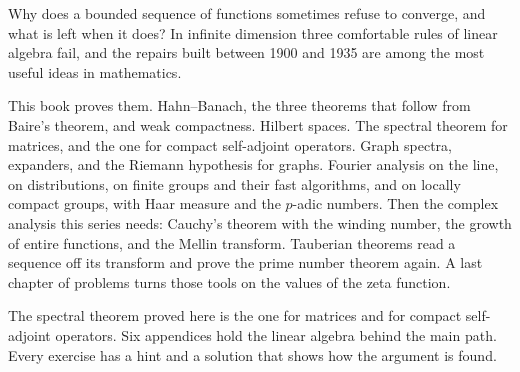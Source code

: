 Why does a bounded sequence of functions sometimes refuse to converge, and what is left when it does? In infinite dimension three comfortable rules of linear algebra fail, and the repairs built between 1900 and 1935 are among the most useful ideas in mathematics.

This book proves them. Hahn--Banach, the three theorems that follow from Baire's theorem, and weak compactness. Hilbert spaces. The spectral theorem for matrices, and the one for compact self-adjoint operators. Graph spectra, expanders, and the Riemann hypothesis for graphs. Fourier analysis on the line, on distributions, on finite groups and their fast algorithms, and on locally compact groups, with Haar measure and the $p$-adic numbers. Then the complex analysis this series needs: Cauchy's theorem with the winding number, the growth of entire functions, and the Mellin transform. Tauberian theorems read a sequence off its transform and prove the prime number theorem again. A last chapter of problems turns those tools on the values of the zeta function.

The spectral theorem proved here is the one for matrices and for compact self-adjoint operators. Six appendices hold the linear algebra behind the main path. Every exercise has a hint and a solution that shows how the argument is found.
